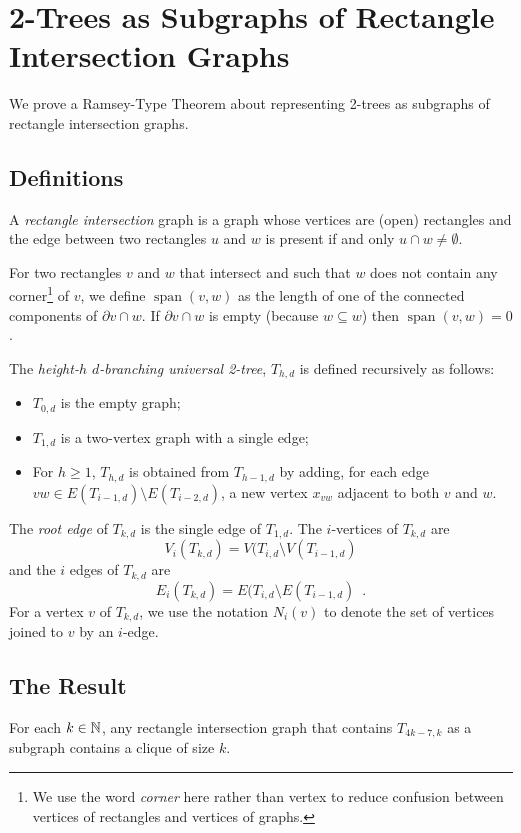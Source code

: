 \documentclass[lotsofwhite]{patmorin}
\DeclareMathOperator{\spn}{span}
\begin{document}
\section{2-Trees as Subgraphs of Rectangle Intersection Graphs}

We prove a Ramsey-Type Theorem about representing 2-trees as subgraphs
of rectangle intersection graphs.

\subsection{Definitions}

A \emph{rectangle intersection} graph is a graph whose vertices are
(open) rectangles and the edge between two rectangles $u$ and $w$ is
present if and only $u\cap w\neq \emptyset$.

For two rectangles $v$ and $w$ that intersect and such that $w$ does not
contain any corner\footnote{We use the word \emph{corner} here rather
than vertex to reduce confusion between vertices of rectangles
and vertices of graphs.} of $v$, we define $\spn(v,w)$
as the length of one of the connected components of $\partial v\cap w$.
If $\partial v\cap w$ is empty (because $w\subseteq w$) then $\spn(v,w)=0$.

The \emph{height-$h$ $d$-branching universal 2-tree}, $T_{h,d}$ is
defined recursively as follows:
\begin{itemize}
  \item $T_{0,d}$ is the empty graph;
  \item $T_{1,d}$ is a two-vertex graph with a single edge;
  \item For $h\ge 1$, $T_{h,d}$ is obtained from $T_{h-1,d}$ by adding,
     for each edge $vw \in E(T_{i-1,d})\setminus E(T_{i-2,d})$,
     a new vertex $x_{vw}$ adjacent to both $v$ and $w$.
\end{itemize}
The \emph{root edge} of $T_{k,d}$ is the single edge of $T_{1,d}$.
The $i$-vertices of $T_{k,d}$ are \[ V_i(T_{k,d}) = V(T_{i,d}\setminus
V(T_{i-1,d}) \] and the $i$ edges of $T_{k,d}$ are \[ E_i(T_{k,d})
= E(T_{i,d}\setminus E(T_{i-1,d}) \enspace . \] For a vertex $v$ of
$T_{k,d}$, we use the notation $N_i(v)$ to denote the set of vertices
joined to $v$ by an $i$-edge.

\subsection{The Result}

\begin{thm}
  For each $k\in \mathbb{N}$, any rectangle intersection graph that contains
  $T_{4k-7,k}$ as a subgraph contains a clique of size $k$.
\end{thm}
\end{document}
